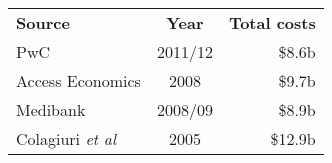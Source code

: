 \bgroup
\def\arraystretch{1.2}
\begin{tabular}{lcr}
\toprule
\textbf{Source} & \textbf{Year} & \textbf{Total costs} \\ \cmidrule(lr){1-3}
PwC & 2011/12 & \$8.6b \\
Access Economics & 2008 & \$9.7b \\
Medibank & 2008/09 & \$8.9b \\
Colagiuri \emph{et al } & 2005 & \$12.9b \\
\bottomrule
\end{tabular}
\egroup